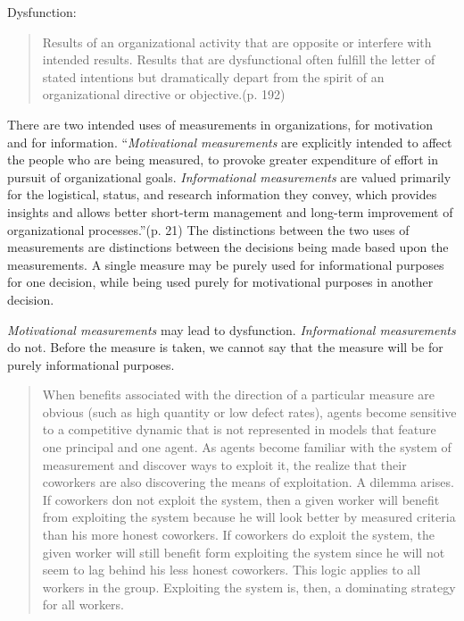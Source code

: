 Dysfunction:
\begin{quote}
Results of an organizational activity that are opposite or interfere with
intended results.  Results that are dysfunctional often fulfill the letter
of stated intentions but dramatically depart from the spirit of an
organizational directive or objective.\cite{Austin96}(p. 192)
\end{quote}


There are two intended uses of measurements in organizations, for
motivation and for information.  ``{\em Motivational measurements} are
explicitly intended to affect the people who are being measured, to provoke
greater expenditure of effort in pursuit of organizational goals.  {\em
  Informational measurements} are valued primarily for the logistical,
status, and research information they convey, which provides insights and
allows better short-term management and long-term improvement of
organizational processes.''\cite{Austin96}(p. 21)  The distinctions between
the two uses of measurements are distinctions between the decisions being
made based upon the measurements.  A single measure may be purely used for
informational purposes for one decision, while being used purely for
motivational purposes in another decision.  


{\em Motivational measurements} may lead to dysfunction.  {\em
  Informational measurements} do not.  Before the measure is taken, we
cannot say that the measure will be for purely informational purposes.


\begin{quote}
When benefits associated with the direction of a particular measure are
obvious (such as high quantity or low defect rates), agents become
sensitive to a competitive dynamic that is not represented in models that
feature one principal and one agent.  As agents become familiar with the
system of measurement and discover ways to exploit it, the realize that
their coworkers are also discovering the means of exploitation.  A dilemma
arises.  If coworkers don not exploit the system, then a given worker will
benefit from exploiting the system because he will look better by measured
criteria than his more honest coworkers.  If coworkers do exploit the
system, the given worker will still benefit form exploiting the system
since he will not seem to lag behind his less honest coworkers.  This logic
applies to all workers in the group.  Exploiting the system is, then, a
dominating strategy for all workers.
\end{quote}\cite{Austin96}


